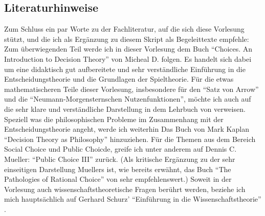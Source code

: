 \subsection{Literaturhinweise}

Zum Schluss ein par Worte zu der Fachliteratur, auf die sich diese Vorlesung
stützt, und die ich als Ergänzung zu diesem Skript als Begeleittexte empfehle:
Zum überwiegenden Teil werde ich in dieser Vorlesung dem Buch "`Choices. An
Introduction to Decision Theory"' von Micheal D. \cite{resnik:1987} folgen. Es
handelt sich dabei um eine didaktisch gut aufbereitete und sehr verständliche
Einführung in die Entscheidungstheorie und die Grundlagen der Spieltheorie.
Für die etwas mathematischeren Teile dieser Vorlesung, insbesondere für den
"`Satz von Arrow"' und die "`Neumann-Morgensternschen Nutzenfunktionen"', möchte
ich auch auf die sehr klare und verständliche Darstellung in dem Lehrbuch von
\cite{mascolell-whinston-green:1995} verweisen. Speziell was die philosophischen
Probleme im Zusammenhang mit der Entscheidungstheorie angeht, werde ich weiterhin
Das Buch von Mark Kaplan "`Decision Theory as Philosophy"' \cite[]{kaplan:1996}
hinzuziehen. Für die Themen aus dem Bereich Social Choice und Public Choicde, 
greife ich unter anderem auf Dennis C. Mueller: "`Public Choice III"'
\cite[]{mueller:2003} zurück. (Als kritische Ergänzung zu der sehr einseitigen
Darstellung Muellers ist, wie bereits erwähnt, das Buch "`The Pathologies of
Rational Choice"' von \cite{green-shapiro:1994}
sehr empfehlenswert.) Soweit in der Vorlesung auch wissenschaftstheoretische Fragen
berührt werden, beziehe ich mich hauptsächlich auf Gerhard Schurz' "`Einführung
in die Wissenschaftstheorie"' \cite[]{schurz:2006}.

